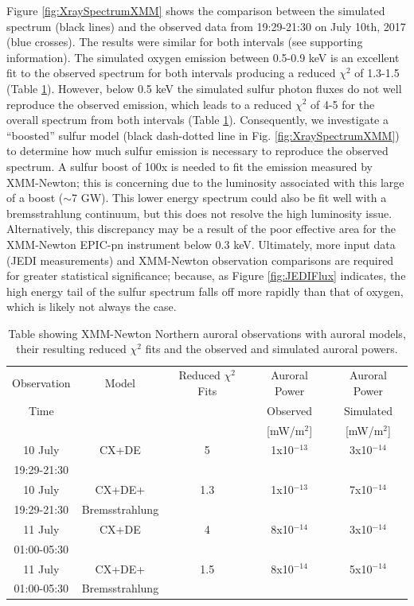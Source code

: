 \documentclass[draft]{agujournal2018}
\begin{document}
Figure \ref{fig:XraySpectrumXMM} shows the comparison between the simulated spectrum (black lines) and the observed data from 19:29-21:30 on July 10th, 2017 (blue crosses).
The results were similar for both intervals (see supporting information).
The simulated oxygen emission between 0.5-0.9 keV is an excellent fit to the observed spectrum for both intervals producing a reduced $\chi^2$ of 1.3-1.5 (Table \ref{tab:XMMComparison}).
However, below 0.5 keV the simulated sulfur photon fluxes do not well reproduce the observed emission, which leads to a reduced $\chi^2$ of 4-5 for the overall spectrum from both intervals (Table \ref{tab:XMMComparison}).
Consequently, we investigate a ``boosted'' sulfur model (black dash-dotted line in Fig. \ref{fig:XraySpectrumXMM}) to determine how much sulfur emission is necessary to reproduce the observed spectrum.
A sulfur boost of 100x is needed to fit the emission measured by XMM-Newton; this is concerning due to the luminosity associated with this large of a boost ($\sim$7 GW).
This lower energy spectrum could also be fit well with a bremsstrahlung continuum, but this does not resolve the high luminosity issue.
Alternatively, this discrepancy may be a result of the poor effective area for the XMM-Newton EPIC-pn instrument below 0.3 keV.
Ultimately, more input data (JEDI measurements) and XMM-Newton observation comparisons are required for greater statistical significance; because, as Figure \ref{fig:JEDIFlux} indicates, the high energy tail of the sulfur spectrum falls off more rapidly than that of oxygen, which is likely not always the case.

\begin{table}
    \centering
    \begin{tabular}{c|c|c|c|c}
    Observation & Model & Reduced $\chi^2$ Fits & Auroral Power & Auroral Power  \\
    Time &  &  & Observed & Simulated  \\
     &  &  & [mW/m$^2$] & [mW/m$^2$] \\ \cline{1-5}
     10 July     & CX+DE          & 5   & 1x10$^{-13}$ & 3x10$^{-14}$ \\
     19:29-21:30 &                &     &              &              \\ \cline{1-5}
     10 July     & CX+DE+         & 1.3 & 1x10$^{-13}$ & 7x10$^{-14}$ \\
     19:29-21:30 & Bremsstrahlung &     &              &              \\ \cline{1-5}
     11 July     & CX+DE          & 4   & 8x10$^{-14}$ & 3x10$^{-14}$ \\
     01:00-05:30 &                &     &              &              \\ \cline{1-5}
     11 July     & CX+DE+         & 1.5 & 8x10$^{-14}$ & 5x10$^{-14}$ \\
     01:00-05:30 & Bremsstrahlung &     &              &              \\ \cline{1-5}
    \end{tabular}
    \label{tab:XMMComparison}
    \caption{Table showing XMM-Newton Northern auroral observations with auroral models, their resulting reduced $\chi^2$ fits and the observed and simulated auroral powers.}
\end{table}
\end{document}
